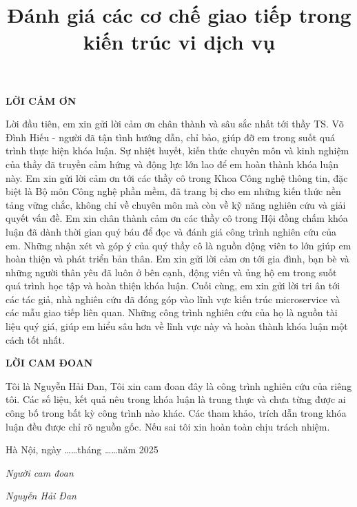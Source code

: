\documentclass{uetgraduation}
\title{Đánh giá các cơ chế giao tiếp trong kiến trúc vi dịch vụ}
\begin{document}
\makecovers

\newpage
\thispagestyle{empty}
\begin{center}
    \textbf{LỜI CẢM ƠN}
\end{center}

Lời đầu tiên, em xin gửi lời cảm ơn chân thành và sâu sắc nhất tới thầy TS. Võ Đình Hiếu - người đã tận tình hướng dẫn, chỉ bảo, giúp đỡ em trong suốt quá trình thực hiện khóa luận. Sự nhiệt huyết, kiến thức chuyên môn và kinh nghiệm của thầy đã truyền cảm hứng và động lực lớn lao để em hoàn thành khóa luận này.
Em xin gửi lời cảm ơn tới các thầy cô trong Khoa Công nghệ thông tin, đặc biệt là Bộ môn Công nghệ phần mềm, đã trang bị cho em những kiến thức nền tảng vững chắc, không chỉ về chuyên môn mà còn về kỹ năng nghiên cứu và giải quyết vấn đề.
Em xin chân thành cảm ơn các thầy cô trong Hội đồng chấm khóa luận đã dành thời gian quý báu để đọc và đánh giá công trình nghiên cứu của em. Những nhận xét và góp ý của quý thầy cô là nguồn động viên to lớn giúp em hoàn thiện và phát triển bản thân.
Em xin gửi lời cảm ơn tới gia đình, bạn bè và những người thân yêu đã luôn ở bên cạnh, động viên và ủng hộ em trong suốt quá trình học tập và hoàn thiện khóa luận.
Cuối cùng, em xin gửi lời tri ân tới các tác giả, nhà nghiên cứu đã đóng góp vào lĩnh vực kiến trúc microservice và các mẫu giao tiếp liên quan. Những công trình nghiên cứu của họ là nguồn tài liệu quý giá, giúp em hiểu sâu hơn về lĩnh vực này và hoàn thành khóa luận một cách tốt nhất.

\newpage
\thispagestyle{empty}
\begin{center}
    \textbf{LỜI CAM ĐOAN}
\end{center}

Tôi là Nguyễn Hải Đan, Tôi xin cam đoan đây là công trình nghiên cứu của riêng tôi. Các số liệu, kết quả nêu trong khóa luận là trung thực và chưa từng được ai công bố trong bất kỳ công trình nào khác. Các tham khảo, trích dẫn trong khóa luận đều được chỉ rõ nguồn gốc. Nếu sai tôi xin hoàn toàn chịu trách nhiệm.

\begin{flushright}
    Hà Nội, ngày \ldots\ldots tháng \ldots\ldots năm 2025

    \vspace{2cm}
    \textit{Người cam đoan}

    \vspace{1cm}
    \textit{Nguyễn Hải Đan}
\end{flushright}
\end{document}
